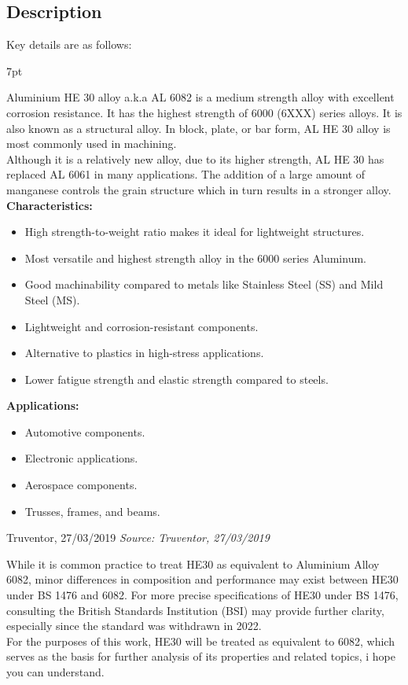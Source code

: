 \documentclass{article}
\newcommand{\formalsource}{} %
\newenvironment{formal}[1][]{%
    \renewcommand{\formalsource}{#1}%
    \def\FrameCommand{%
        \hspace{1pt}%
        {\color{darkblue}\vrule width 2pt}%
        {\color{formalshade}\vrule width 4pt}%
        \colorbox{formalshade}%
    }%
    \MakeFramed{\advance\hsize-\width\FrameRestore}%
    \noindent\hspace{-4.55pt}%
    \begin{adjustwidth}{}{7pt}%
        \vspace{2pt}%
    }%
    {%
        \vspace{2pt}%
        \ifx\formalsource\empty %
        \else
        \hfill{\footnotesize\textit{Source: \formalsource}}%
        \fi
    \end{adjustwidth}\endMakeFramed%
}
\begin{document}
\subsection{Description}
Key details are as follows:
\begin{formal}[Truventor, 27/03/2019]
Aluminium HE 30 alloy a.k.a AL 6082 is a medium strength alloy with excellent corrosion resistance. It
has the highest strength of 6000 (6XXX) series alloys. It is also known as a structural alloy. In block,
plate, or bar form, AL HE 30 alloy is most commonly used in machining.\\[1em]
Although it is a relatively new alloy, due to its higher strength, AL HE 30 has replaced AL 6061 in many
applications. The addition of a large amount of manganese controls the grain structure which in turn
results in a stronger alloy.\\[1em]
\textbf{Characteristics:}
\begin{itemize}
    \item High strength-to-weight ratio makes it ideal for lightweight structures.
    \item Most versatile and highest strength alloy in the 6000 series Aluminum.
    \item Good machinability compared to metals like Stainless Steel (SS) and Mild Steel (MS).
    \item Lightweight and corrosion-resistant components.
    \item Alternative to plastics in high-stress applications.
    \item Lower fatigue strength and elastic strength compared to steels.
\end{itemize}
\textbf{Applications:}
\begin{itemize}
    \item Automotive components.
    \item Electronic applications.
    \item Aerospace components.
    \item Trusses, frames, and beams.
\end{itemize}
\vspace{-8pt}
\end{formal}\noindent
While it is common practice to treat HE30 as equivalent to Aluminium Alloy 6082, minor differences in composition and performance may exist between HE30 under BS 1476 and 6082. For more precise specifications of HE30 under BS 1476, consulting the British Standards Institution (BSI) may provide further clarity, especially since the standard was withdrawn in 2022.\\[1em]
For the purposes of this work, HE30 will be treated as equivalent to 6082, which serves as the basis for further analysis of its properties and related topics, i hope you can understand.
\end{document}
